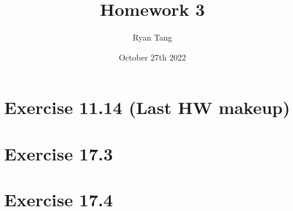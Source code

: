 \documentclass[11pt, letterpaper]{article}
\title{Homework 3}
\author{Ryan Tang}
\date{October 27th 2022}
\begin{document}
\maketitle

\section{Exercise 11.14 (Last HW makeup)}



\section{Exercise 17.3}
\section{Exercise 17.4}
\end{document}
